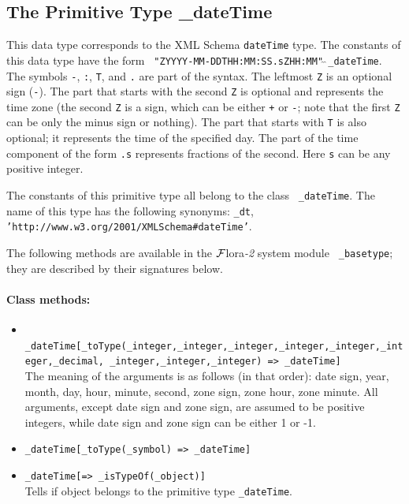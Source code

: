 \documentclass[11pt]{article}
\newcommand{\FLORA}{{\mbox{\sc ${\cal F}${lora}\rm\emph{-2}}}\xspace}
\begin{document}
\subsection{ The Primitive Type \_dateTime}

This data type corresponds to the XML Schema {\tt dateTime} type.  The
constants of this data type have the form {\tt
  "ZYYYY-MM-DDTHH:MM:SS.sZHH:MM"$\hat{~}\hat{~}$\_dateTime}.  The symbols
{\tt -}, {\tt :}, {\tt T}, and {\tt .}  are part of the syntax. The
leftmost {\tt Z} is an optional sign ({\tt -}). The part that starts with
the second {\tt Z} is optional and represents the time zone (the second
{\tt Z} is a sign, which can be either {\tt +} or {\tt -}; note that the
first {\tt Z} can be only the minus sign or nothing). The part that starts
with {\tt T} is also optional; it represents the time of the specified
day. The part of the time component of the form {\tt .s} represents
fractions of the second. Here {\tt s}  can be any positive integer.


The constants of this primitive type all belong to the class {\tt
  \_dateTime}.  The name of this type has the following synonyms:
{\tt \_dt},  {\tt 'http://www.w3.org/2001/XMLSchema\#dateTime'}. 

The following methods are available in the \FLORA system module {\tt
  \_basetype}; they are described by their signatures below.

\paragraph{Class methods:}
\begin{itemize}
\item {\tt
    \_dateTime[\_toType(\_integer,\_integer,\_integer,\_integer,\_integer,\_integer,\_decimal,
    \_integer,\_integer,\_integer)
    => \_dateTime]} \\
  The meaning of the arguments is as follows (in that order): date sign, year, month, day, hour, minute, second, zone sign, zone hour, zone minute.
  All arguments, except date sign and zone sign, are assumed to be positive integers, while date sign and zone sign can be either 1 or -1.
\item {\tt \_dateTime[\_toType(\_symbol) => \_dateTime]}  
\item {\tt \_dateTime[=> \_isTypeOf(\_object)]}  \\
  Tells if object belongs to the primitive type {\tt \_dateTime}. 
\end{itemize}
\end{document}
